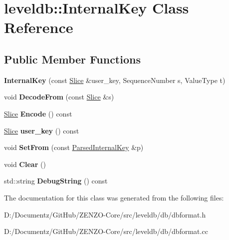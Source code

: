 \hypertarget{classleveldb_1_1_internal_key}{}\section{leveldb\+::Internal\+Key Class Reference}
\label{classleveldb_1_1_internal_key}
\subsection*{Public Member Functions}
\begin{DoxyCompactItemize}
\item 
\mbox{\label{classleveldb_1_1_internal_key_af436814d1667db55e93b6bd583619617}} 
{\bfseries Internal\+Key} (const \mbox{\hyperlink{classleveldb_1_1_slice}{Slice}} \&user\+\_\+key, Sequence\+Number s, Value\+Type t)
\item 
\mbox{\label{classleveldb_1_1_internal_key_a5a8c9bced0ba968b6b62d91cfb19a82a}} 
void {\bfseries Decode\+From} (const \mbox{\hyperlink{classleveldb_1_1_slice}{Slice}} \&s)
\item 
\mbox{\label{classleveldb_1_1_internal_key_a0cb2fdabc879bdbe7afc3ba12152384c}} 
\mbox{\hyperlink{classleveldb_1_1_slice}{Slice}} {\bfseries Encode} () const
\item 
\mbox{\label{classleveldb_1_1_internal_key_a9673dbb181eaa977e6f09c45b02938bc}} 
\mbox{\hyperlink{classleveldb_1_1_slice}{Slice}} {\bfseries user\+\_\+key} () const
\item 
\mbox{\label{classleveldb_1_1_internal_key_ada9566cd92b6b9784ab7f2f6f71d0a4e}} 
void {\bfseries Set\+From} (const \mbox{\hyperlink{structleveldb_1_1_parsed_internal_key}{Parsed\+Internal\+Key}} \&p)
\item 
\mbox{\label{classleveldb_1_1_internal_key_ab6e9ebec1bf567de89d8dd34fdc51f86}} 
void {\bfseries Clear} ()
\item 
\mbox{\label{classleveldb_1_1_internal_key_ad5812d3c90842906266e50b5a5911f84}} 
std\+::string {\bfseries Debug\+String} () const
\end{DoxyCompactItemize}


The documentation for this class was generated from the following files\+:\begin{DoxyCompactItemize}
\item 
D\+:/\+Documentz/\+Git\+Hub/\+Z\+E\+N\+Z\+O-\/\+Core/src/leveldb/db/dbformat.\+h\item 
D\+:/\+Documentz/\+Git\+Hub/\+Z\+E\+N\+Z\+O-\/\+Core/src/leveldb/db/dbformat.\+cc\end{DoxyCompactItemize}
